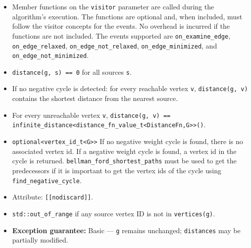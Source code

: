 \begin{itemdescr}
\begin{itemize}
                  \item Member functions on the \lstinline{visitor} parameter are called during the algorithm's execution.
                        The functions are optional and, when included, must follow the visitor concepts for the events.
                        No overhead is incurred if the functions are not included.
                        The events supported are \lstinline{on_examine_edge}, \lstinline{on_edge_relaxed}, \lstinline{on_edge_not_relaxed},
                        \lstinline{on_edge_minimized}, and \lstinline{on_edge_not_minimized}.
            \end{itemize}
      \pnum\postconditions
            \begin{itemize}
                  \item \lstinline{distance(g, s) == 0} for all sources \lstinline{s}.
                  \item If no negative cycle is detected: for every reachable vertex \lstinline{v},
                        \lstinline{distance(g, v)} contains the shortest distance from the nearest source.
                  \item For every unreachable vertex \lstinline{v},
                        \lstinline{distance(g, v) == infinite_distance<distance_fn_value_t<DistanceFn,G>>()}.
            \end{itemize}
      \pnum\returns 
            \begin{itemize}
                  \item \lstinline{optional<vertex_id_t<G>>} If no negative weight cycle is found, 
                        there is no associated vertex id. If a negative weight cycle is found, a
                        vertex id in the cycle is returned. \lstinline{bellman_ford_shortest_paths} must be used
                        to get the predecessors if it is important to get the vertex ids of the cycle
                        using \lstinline{find_negative_cycle}.
                  \item Attribute: \lstinline{[[nodiscard]]}.
            \end{itemize}
      \pnum\throws
            \begin{itemize}
                  \item \lstinline{std::out_of_range} if any source vertex ID is not in \lstinline{vertices(g)}.
                  \item \textbf{Exception guarantee:} Basic --- \lstinline{g} remains unchanged;
                        \lstinline{distances} may be partially modified.

\end{itemize}
\end{itemdescr}
